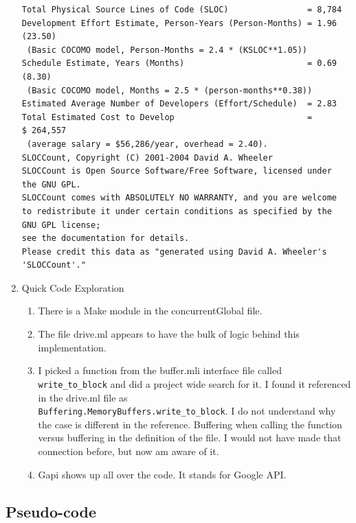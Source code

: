 \begin{enumerate}
\begin{verbatim}
Total Physical Source Lines of Code (SLOC)                = 8,784
Development Effort Estimate, Person-Years (Person-Months) = 1.96 
(23.50)
 (Basic COCOMO model, Person-Months = 2.4 * (KSLOC**1.05))
Schedule Estimate, Years (Months)                         = 0.69 
(8.30)
 (Basic COCOMO model, Months = 2.5 * (person-months**0.38))
Estimated Average Number of Developers (Effort/Schedule)  = 2.83
Total Estimated Cost to Develop                           = 
$ 264,557
 (average salary = $56,286/year, overhead = 2.40).
SLOCCount, Copyright (C) 2001-2004 David A. Wheeler
SLOCCount is Open Source Software/Free Software, licensed under 
the GNU GPL.
SLOCCount comes with ABSOLUTELY NO WARRANTY, and you are welcome 
to redistribute it under certain conditions as specified by the 
GNU GPL license;
see the documentation for details.
Please credit this data as "generated using David A. Wheeler's 
'SLOCCount'."
  \end{verbatim}
  \item Quick Code Exploration
    \begin{enumerate}
    \item There is a Make module in the concurrentGlobal file. 
    \item The file drive.ml appears to have the bulk of logic behind
      this implementation.
    \item I picked a function from the buffer.mli interface file
      called \verb|write_to_block| and did a project wide search for
      it. I found it referenced in the drive.ml file as
      \\ \verb|Buffering.MemoryBuffers.write_to_block|. I do not
      understand why the case is different in the reference. Buffering
      when calling the function versus buffering in the definition of
      the file. I would not have made that connection before, but now
      am aware of it.
    \item Gapi shows up all over the code. It stands for Google API.
    \end{enumerate}
  \end{enumerate}

\subsection{Pseudo-code}
